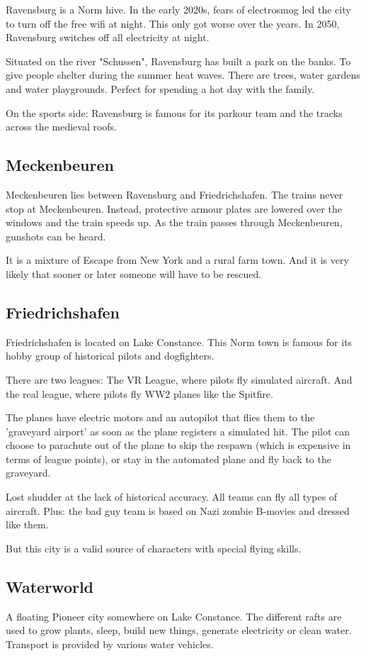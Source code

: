 Ravensburg is a Norm hive.
In the early 2020s, fears of electrosmog led the city to turn off the free wifi at night. This only got worse over the years. In 2050, Ravensburg switches off all electricity at night.

Situated on the river "Schussen", Ravensburg has built a park on the banks. To give people shelter during the summer heat waves. There are trees, water gardens and water playgrounds. Perfect for spending a hot day with the family.

On the sports side: Ravensburg is famous for its parkour team and the tracks across the medieval roofs.

\subsection{Meckenbeuren}

Meckenbeuren lies between Ravensburg and Friedrichshafen. The trains never stop at Meckenbeuren. Instead, protective armour plates are lowered over the windows and the train speeds up. As the train passes through Meckenbeuren, gunshots can be heard.

It is a mixture of Escape from New York and a rural farm town. And it is very likely that sooner or later someone will have to be rescued.

\subsection{Friedrichshafen}

Friedrichshafen is located on Lake Constance. This Norm town is famous for its hobby group of historical pilots and dogfighters.

There are two leagues: The VR League, where pilots fly simulated aircraft. And the real league, where pilots fly WW2 planes like the Spitfire.

The planes have electric motors and an autopilot that flies them to the 'graveyard airport' as soon as the plane registers a simulated hit.
The pilot can choose to parachute out of the plane to skip the respawn (which is expensive in terms of league points), or stay in the automated plane and fly back to the graveyard.

Lost shudder at the lack of historical accuracy. All teams can fly all types of aircraft. Plus: the bad guy team is based on Nazi zombie B-movies and dressed like them.

But this city is a valid source of characters with special flying skills.

\subsection{Waterworld}

A floating Pioneer city somewhere on Lake Constance. The different rafts are used to grow plants, sleep, build new things, generate electricity or clean water. Transport is provided by various water vehicles.